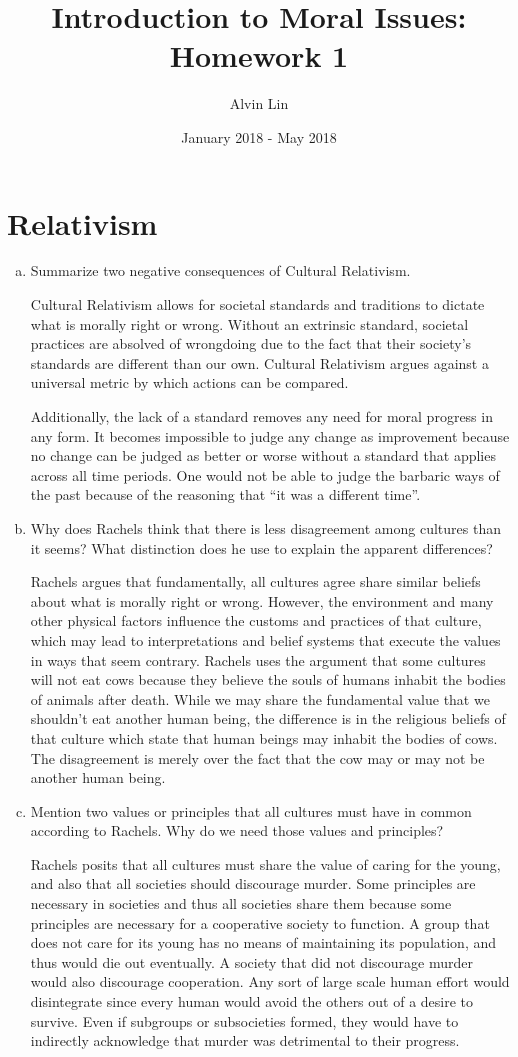 \documentclass{article}
\title{Introduction to Moral Issues: Homework 1}
\author{Alvin Lin}
\date{January 2018 - May 2018}
\begin{document}
\maketitle

\section*{Relativism}
\begin{enumerate}[a)]
  \item Summarize two negative consequences of Cultural Relativism.
  \par Cultural Relativism allows for societal standards and traditions to dictate what is morally right or wrong. Without an extrinsic standard, societal practices are absolved of wrongdoing due to the fact that their society's standards are different than our own. Cultural Relativism argues against a universal metric by which actions can be compared.
  \par Additionally, the lack of a standard removes any need for moral progress in any form. It becomes impossible to judge any change as improvement because no change can be judged as better or worse without a standard that applies across all time periods. One would not be able to judge the barbaric ways of the past because of the reasoning that ``it was a different time''.
  \item Why does Rachels think that there is less disagreement among cultures than it seems? What distinction does he use to explain the apparent differences?
  \par Rachels argues that fundamentally, all cultures agree share similar beliefs about what is morally right or wrong. However, the environment and many other physical factors influence the customs and practices of that culture, which may lead to interpretations and belief systems that execute the values in ways that seem contrary. Rachels uses the argument that some cultures will not eat cows because they believe the souls of humans inhabit the bodies of animals after death. While we may share the fundamental value that we shouldn't eat another human being, the difference is in the religious beliefs of that culture which state that human beings may inhabit the bodies of cows. The disagreement is merely over the fact that the cow may or may not be another human being.
  \item Mention two values or principles that all cultures must have in common according to Rachels. Why do we need those values and principles?
  \par Rachels posits that all cultures must share the value of caring for the young, and also that all societies should discourage murder. Some principles are necessary in societies and thus all societies share them because some principles are necessary for a cooperative society to function. A group that does not care for its young has no means of maintaining its population, and thus would die out eventually. A society that did not discourage murder would also discourage cooperation. Any sort of large scale human effort would disintegrate since every human would avoid the others out of a desire to survive. Even if subgroups or subsocieties formed, they would have to indirectly acknowledge that murder was detrimental to their progress.

\end{enumerate}
\end{document}
